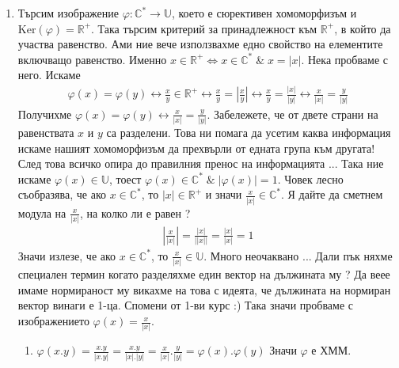 \documentclass[12pt]{article}
\begin{document}
\begin{enumerate}[label=\alph*)]
    \item Търсим изображение \(\varphi : \mathbb{C}^* \to \mathbb{U}\),
    което е сюрективен хомоморфизъм и \(\mathrm{Ker}(\varphi) = \mathbb{R}^+\).
    Така търсим критерий за принадлежност към \(\mathbb{R}^+\), в който да участва равенство. Ами ние вече използвахме едно свойство на елементите включващо равенство.
    Именно \(x \in \mathbb{R}^+ \iff x \in \mathbb{C}^* \; \& \; x = |x|\).
    Нека пробваме с него.
    Искаме \begin{align*}
        \varphi(x) = \varphi(y) \longleftrightarrow 
        \displaystyle\frac{x}{y} \in \mathbb{R}^+ \longleftrightarrow 
        \displaystyle\frac{x}{y} = \left|\displaystyle\frac{x}{y}\right| \longleftrightarrow
        \displaystyle\frac{x}{y} = \displaystyle\frac{|x|}{|y|} \longleftrightarrow
        \displaystyle\frac{x}{|x|} = \displaystyle\frac{y}{|y|}
    \end{align*}
    Получихме \(\varphi(x) = \varphi(y) \longleftrightarrow
        \displaystyle\frac{x}{|x|} = \displaystyle\frac{y}{|y|}\).
    Забележете, че от двете страни на равенствата \(x\) и \(y\) са разделени.
    Това ни помага да усетим каква информация искаме нашият хомоморфизъм да прехвърли от едната група към другата! След това всичко опира до правилния пренос на информацията ...
    Така ние искаме \(\varphi(x) \in \mathbb{U}\), тоест \(\varphi(x) \in \mathbb{C}^* \; \& \; |\varphi(x)| = 1\). Човек лесно съобразява, че ако  \(x \in \mathbb{C}^*\),
     то \(|x| \in \mathbb{R}^+\) и значи \(\displaystyle\frac{x}{|x|} \in \mathbb{C}^*\).
    Я дайте да сметнем модула на \(\displaystyle\frac{x}{|x|}\), на колко ли е равен ?
    \begin{align*}
        \left|\displaystyle\frac{x}{|x|}\right| = \displaystyle\frac{|x|}{||x||} = \displaystyle\frac{|x|}{|x|} = 1
    \end{align*}
    Значи излезе, че ако \(x \in \mathbb{C}^*\), то \(\displaystyle\frac{x}{|x|} \in \mathbb{U}\). Много неочаквано ... Дали пък няхме специален термин когато разделяхме един вектор на дължината му ? Да веее имаме нормираност му викахме на това с идеята, че дължината на нормиран вектор винаги е 1-ца. Спомени от 1-ви курс :)
    Така значи пробваме с изображението \(\varphi(x) = \displaystyle\frac{x}{|x|}\).
    \begin{enumerate}[label=\arabic*.]
        \item \(\varphi(x.y) = \displaystyle\frac{x.y}{|x.y|} = \displaystyle\frac{x.y}{|x|.|y|} = \displaystyle\frac{x}{|x|}.\displaystyle\frac{y}{|y|} = \varphi(x).\varphi(y)\) Значи  \(\varphi\) е ХММ.

\end{enumerate}
\end{enumerate}
\end{document}
